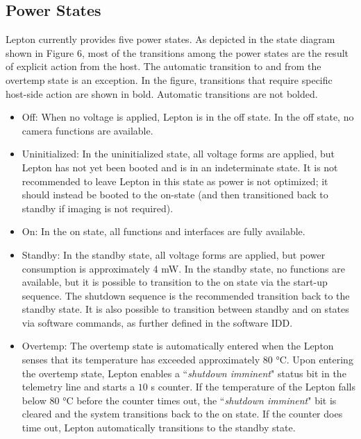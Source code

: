 \subsection{Power States}
\label{ssec:powerstate}
Lepton currently provides five power states. As depicted in the state diagram
shown in Figure 6, most of the transitions among the power states are the result
of explicit action from the host. The automatic transition to and from the
overtemp state is an exception. In the figure, transitions that require specific
host-side action are shown in bold. Automatic transitions are not bolded.
%
\begin{itemize} \item Off: When no voltage is applied, Lepton is in the off
state. In the off state, no camera functions are available. \item Uninitialized:
In the uninitialized state, all voltage forms are applied, but Lepton has not
yet been booted and is in an indeterminate state. It is not recommended to leave
Lepton in this state as power is not optimized; it should instead be booted to
the on-state (and then transitioned back to standby if imaging is not required).
\item On: In the on state, all functions and interfaces are fully available.
\item Standby: In the standby state, all voltage forms are applied, but power
consumption is approximately 4 \si{\milli\watt}. In the standby state, no
functions are available, but it is possible to transition to the on state via
the start-up sequence. The shutdown sequence is the recommended transition back
to the standby state. It is also possible to transition between standby and on
states via software commands, as further defined in the software IDD. \item
Overtemp: The overtemp state is automatically entered when the Lepton senses
that its temperature has exceeded approximately $80$ \si{\celsius}. Upon
entering the overtemp state, Lepton enables a ``\emph{shutdown imminent}" status
bit in the telemetry line and starts a $10$ \si{\second} counter. If the
temperature of the Lepton falls below $80$ \si{\celsius} before the counter
times out, the ``\emph{shutdown imminent}" bit is cleared and the system
transitions back to the on state. If the counter does time out, Lepton
automatically transitions to the standby state. \end{itemize}
%
